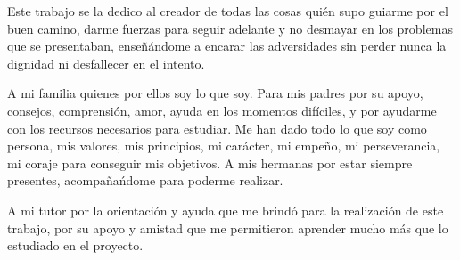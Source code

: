 
Este trabajo se la dedico al creador de todas las cosas qui\'en supo guiarme por el buen
camino, darme fuerzas para seguir adelante y no desmayar en los
problemas que se presentaban, ense\~n\'andome a encarar las
adversidades sin perder nunca la dignidad ni desfallecer en el
intento.

A mi familia quienes por ellos soy lo que soy.
Para mis padres por su apoyo, consejos, comprensi\'on, amor, ayuda
en los momentos dif\'iciles, y por ayudarme con los recursos necesarios
para estudiar. Me han dado todo lo que soy como persona, mis
valores, mis principios, mi car\'acter, mi empe\~no, mi perseverancia,
mi coraje para conseguir mis objetivos.
A mis hermanas por estar siempre presentes, acompa\~na\'ndome para
poderme realizar. 


A mi tutor por la orientaci\'on y ayuda que me brind\'o para la realizaci\'on de este trabajo, por su apoyo y amistad que me permitieron aprender mucho m\'as que lo estudiado en el proyecto.
